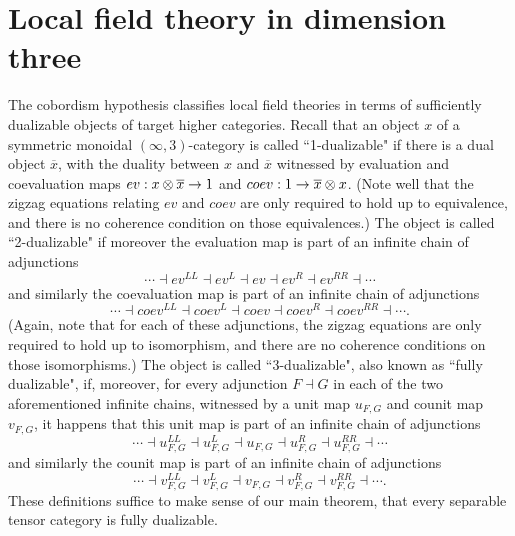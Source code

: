 \documentclass{amsart}
\begin{document}
\section{Local field theory in dimension three} \label{sec:lft}

The cobordism hypothesis \cite{MR1355899, lurie-ch} classifies local field theories in terms of sufficiently dualizable objects of target higher categories.  Recall that an object $x$ of a symmetric monoidal $(\infty,3)$-category is called ``1-dualizable" if there is a dual object $\overline{x}$, with the duality between $x$ and $\overline{x}$ witnessed by evaluation and coevaluation maps $ev: x \otimes \overline{x} \rightarrow 1$ and $coev: 1 \rightarrow \overline{x} \otimes x$.  (Note well that the zigzag equations relating $ev$ and $coev$ are only required to hold up to equivalence, and there is no coherence condition on those equivalences.)  The object is called ``2-dualizable" if moreover the evaluation map is part of an infinite chain of adjunctions 
$$\cdots \dashv ev^{LL} \dashv ev^L \dashv ev \dashv ev^R \dashv ev^{RR} \dashv \cdots$$
and similarly the coevaluation map is part of an infinite chain of adjunctions 
$$\cdots \dashv coev^{LL} \dashv coev^L \dashv coev \dashv coev^R \dashv coev^{RR} \dashv \cdots.$$  
(Again, note that for each of these adjunctions, the zigzag equations are only required to hold up to isomorphism, and there are no coherence conditions on those isomorphisms.)
The object is called ``3-dualizable", also known as ``fully dualizable", if, moreover, for every adjunction $F \dashv G$ in each of the two aforementioned infinite chains, witnessed by a unit map $u_{F,G}$ and counit map $v_{F,G}$, it happens that this unit map is part of an infinite chain of adjunctions 
$$\cdots \dashv u_{F,G}^{LL} \dashv u_{F,G}^L \dashv u_{F,G} \dashv u_{F,G}^R \dashv u_{F,G}^{RR} \dashv \cdots$$ 
and similarly the counit map is part of an infinite chain of adjunctions 
$$\cdots \dashv v_{F,G}^{LL} \dashv v_{F,G}^L \dashv v_{F,G} \dashv v_{F,G}^R \dashv v_{F,G}^{RR} \dashv \cdots.$$  
These definitions suffice to make sense of our main theorem, that every separable tensor category is fully dualizable.  
\end{document}
